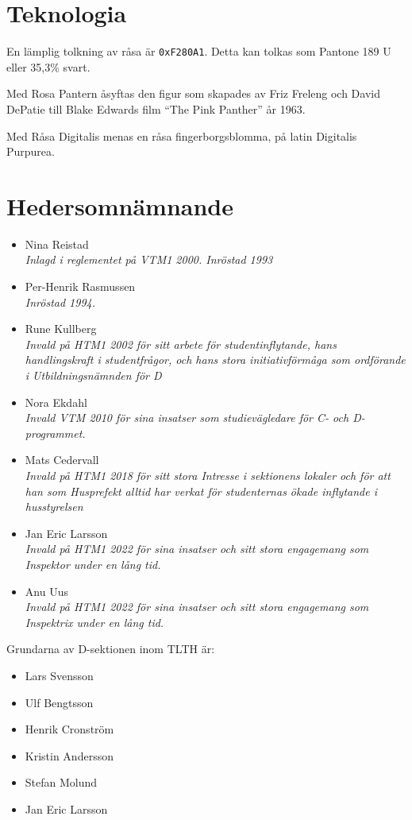 \documentclass{dsekregulations}
\begin{document}
\coverpage
\section{Teknologia}

   En lämplig tolkning av råsa är \texttt{0xF280A1}. Detta kan
  tolkas som Pantone 189 U eller 35,3\% svart.

   Med Rosa Pantern åsyftas den figur som skapades av
  Friz Freleng och David DePatie till Blake Edwards film ``The Pink Panther'' år
  1963.

   Med Råsa Digitalis menas en råsa fingerborgsblomma,
  på latin Digitalis Purpurea.

\section{Hedersomnämnande}
  \begin{itemize}
    \item Nina Reistad \\
      \emph{Inlagd i reglementet på VTM1 2000. Inröstad 1993}
    \item Per-Henrik Rasmussen \\ \emph{Inröstad 1994.}
    \item Rune Kullberg \\
      \emph{Invald på HTM1 2002 för sitt arbete för studentinflytande, hans
      handlingskraft i studentfrågor, och hans stora initiativförmåga som
      ordförande i Utbildningsnämnden för D}
    \item Nora Ekdahl \\
      \emph{Invald VTM 2010 för sina insatser som studievägledare för C- och
      D-programmet.}
    \item Mats Cedervall \\
      \emph{Invald på HTM1 2018 för sitt stora Intresse i sektionens lokaler och
      för att han som Husprefekt alltid har verkat för studenternas ökade
      inflytande i husstyrelsen}
    \item Jan Eric Larsson \\
      \emph{Invald på HTM1 2022 för sina insatser och sitt stora engagemang som
      Inspektor under en lång tid.}
    \item Anu Uus \\
      \emph{Invald på HTM1 2022 för sina insatser och sitt stora engagemang som
      Inspektrix under en lång tid.}
  \end{itemize}

   Grundarna av D-sektionen inom
  TLTH är:
  \begin{itemize}
  \item Lars Svensson
  \item Ulf Bengtsson
  \item Henrik Cronström
  \item Kristin Andersson
  \item Stefan Molund
  \item Jan Eric Larsson
  \end{itemize}
\end{document}
